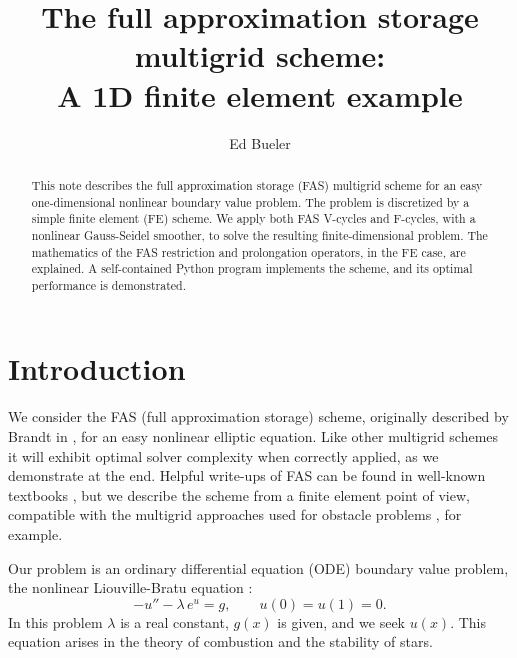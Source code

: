 \documentclass[letterpaper,final,12pt,reqno]{amsart}
\begin{document}
\title[The FAS multigrid scheme]{The full approximation storage multigrid scheme: \\ A 1D finite element example}

\author{Ed Bueler}

\begin{abstract}  This note describes the full approximation storage (FAS) multigrid scheme for an easy one-dimensional nonlinear boundary value problem.  The problem is discretized by a simple finite element (FE) scheme.  We apply both FAS V-cycles and F-cycles, with a nonlinear Gauss-Seidel smoother, to solve the resulting finite-dimensional problem.  The mathematics of the FAS restriction and prolongation operators, in the FE case, are explained.  A self-contained Python program implements the scheme, and its optimal performance is demonstrated.
\end{abstract}

\maketitle

\thispagestyle{empty}
\bigskip

\section{Introduction}  \label{sec:intro}

We consider the FAS (full approximation storage) scheme, originally described by Brandt in \cite{Brandt1977}, for an easy nonlinear elliptic equation.  Like other multigrid schemes it will exhibit optimal solver complexity \cite{Bueler2021} when correctly applied, as we demonstrate at the end.  Helpful write-ups of FAS can be found in well-known textbooks \cite{BrandtLivne2011,Briggsetal2000,Trottenbergetal2001}, but we describe the scheme from a finite element point of view, compatible with the multigrid approaches used for obstacle problems \cite{GraeserKornhuber2009}, for example.

Our problem is an ordinary differential equation (ODE) boundary value problem, the nonlinear Liouville-Bratu equation \cite{Bratu1914,Liouville1853}:
\begin{equation}
  -u'' - \lambda\, e^u = g,  \qquad u(0) = u(1) = 0.  \label{liouvillebratu}
\end{equation}
In this problem $\lambda$ is a real constant, $g(x)$ is given, and we seek $u(x)$.  This equation arises in the theory of combustion \cite{FrankKameneckij1955} and the stability of stars.
\end{document}
